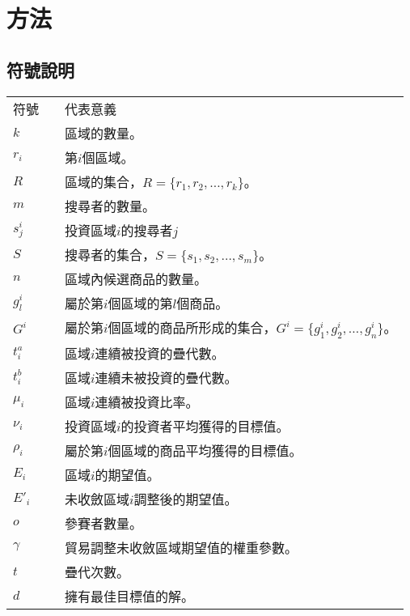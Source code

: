 \chapter{方法}
\label{chapter:method}
\section{符號說明}
\begin{table}[h]
    \small
    \centering
    \begin{tabular}{lll}
        \centering
        符號        &   &代表意義     \\
        $k$         &   &區域的數量。 \\
        $r_i$       &   &第$i$個區域。 \\
        $R$         &   &區域的集合，$R=\{r_1, r_2, \dots, r_k\}$。 \\
        $m$         &   &搜尋者的數量。 \\
        $s^i_j$     &   &投資區域$i$的搜尋者$j$ \\
        $S$         &   &搜尋者的集合，$S=\{s_1, s_2, \dots, s_m\}$。 \\
        $n$         &   &區域內候選商品的數量。 \\
        $g^i_l$     &   &屬於第$i$個區域的第$l$個商品。 \\
        $G^i$       &   &屬於第$i$個區域的商品所形成的集合，$G^i=\{g^i_1, g^i_2, \dots, g^i_n\}$。 \\
        $t^a_i$     &   &區域$i$連續被投資的疊代數。 \\
        $t^b_i$     &   &區域$i$連續未被投資的疊代數。 \\
        $\mu_i$     &   &區域$i$連續被投資比率。 \\
        $\nu_i$     &   &投資區域$i$的投資者平均獲得的目標值。 \\
        $\rho_i$    &   &屬於第$i$個區域的商品平均獲得的目標值。 \\
        $E_i$       &   &區域$i$的期望值。 \\
        $E'_i$      &   &未收斂區域$i$調整後的期望值。 \\
        $o$         &   &參賽者數量。 \\
        $\gamma$    &   &貿易調整未收斂區域期望值的權重參數。 \\
        $t$         &   &疊代次數。 \\
        $d$         &   &擁有最佳目標值的解。 \\
    \end{tabular}
    \label{table:percentage}
    \end{table}
